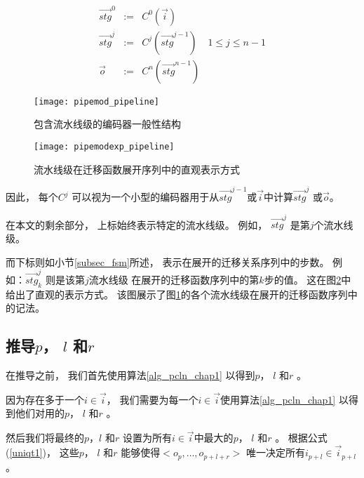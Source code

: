 \begin{equation}\label{equ_genpipe}
\begin{array}{cccc}
\vec{stg}^0   & := & C^0(\vec{i})         &\\
\vec{stg}^j   & := & C^j(\vec{stg}^{j-1}) & 1\le j\le n-1\\
\vec{o}       & := & C^n(\vec{stg}^{n-1}) &
\end{array}
\end{equation}


\begin{figure}[t]
\begin{center}
\texttt{[image: pipemod\_pipeline]}
\end{center}
\caption{包含流水线级的编码器一般性结构}
  \label{fig_pipeenc_chap4}
\end{figure}

\begin{figure}[b]
\begin{center}
\texttt{[image: pipemodexp\_pipeline]}
\end{center}
\caption{流水线级在迁移函数展开序列中的直观表示方式}
  \label{fig_pipeencexp_chap4}
\end{figure}


因此，
每个$C^j$ 可以视为一个小型的编码器用于从$\vec{stg}^{j-1}$或$\vec{i}$中计算$\vec{stg}^j$ 或$\vec{o}$。


在本文的剩余部分，
上标始终表示特定的流水线级。
例如，
$\vec{stg}^j$ 是第$j$个流水线级。

而下标则如小节\ref{subsec_fsm}所述，
表示在展开的迁移关系序列中的步数。
例如：$\vec{stg}^j_k$ 则是该第$j$流水线级
在展开的迁移函数序列中的第$k$步的值。
这在图\ref{fig_pipeencexp_chap4}中给出了直观的表示方式。
该图展示了图\ref{fig_pipeenc_chap4}的各个流水线级在展开的迁移函数序列中的记法。


\subsection{推导$p$， $l$ 和$r$}\label{subsec_inferplr}
在推导之前，
我们首先使用算法\ref{alg_pcln_chap1} 以得到$p$， $l$ 和$r$ 。

因为存在多于一个$i\in \vec{i}$，
我们需要为每一个$i\in \vec{i}$使用算法\ref{alg_pcln_chap1}
以得到他们对用的$p$， $l$ 和$r$ 。

然后我们将最终的$p$，$l$ 和$r$ 设置为所有$i\in \vec{i}$中最大的$p$， $l$ 和$r$ 。
根据公式(\ref{uniqt1})，
这些$p$， $l$ 和$r$ 能够使得$<o_{p},\dots,o_{p+l+r}>$ 唯一决定所有$i_{p+l}\in \vec{i}_{p+l}$。


